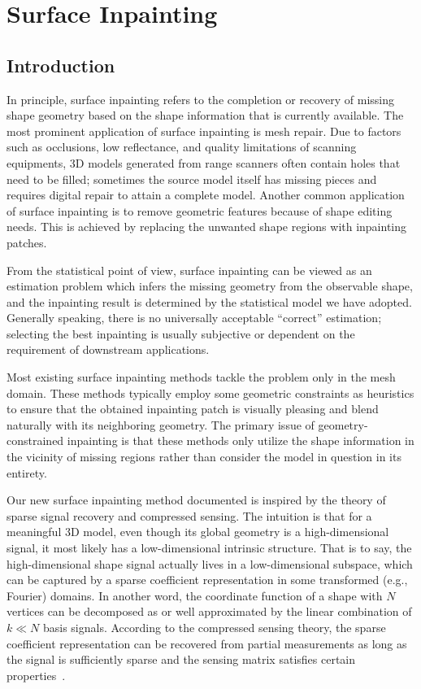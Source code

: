 \chapter{Surface Inpainting}

\section{Introduction}

In principle, surface inpainting refers to the completion or recovery of
missing shape geometry based on the shape information that is currently
available. The most prominent application of surface inpainting is mesh repair.
Due to factors such as occlusions, low reflectance, and quality limitations of
scanning equipments, 3D models generated from range scanners often contain
holes that need to be filled; sometimes the source model itself has missing
pieces and requires digital repair to attain a complete model. Another common
application of surface inpainting is to remove geometric features because of
shape editing needs. This is achieved by replacing the unwanted shape regions
with inpainting patches.

From the statistical point of view, surface inpainting can be viewed as an
estimation problem which infers the missing geometry from the observable shape,
and the inpainting result is determined by the statistical model we have
adopted. Generally speaking, there is no universally acceptable ``correct''
estimation; selecting the best inpainting is usually subjective or dependent on
the requirement of downstream applications.

Most existing surface inpainting methods tackle the problem only in
the mesh domain. These methods typically employ some geometric
constraints as heuristics to ensure that the obtained inpainting patch
is visually pleasing and blend naturally with its neighboring
geometry. The primary issue of geometry-constrained inpainting is that
these methods only utilize the shape information in the vicinity of
missing regions rather than consider the model in question in its
entirety.

Our new surface inpainting method documented is inspired
by the theory of sparse signal recovery and compressed sensing. The
intuition is that for a meaningful 3D model, even though its global
geometry is a high-dimensional signal, it most likely has a
low-dimensional intrinsic structure. That is to say, the
high-dimensional shape signal actually lives in a low-dimensional
subspace, which can be captured by a sparse coefficient representation
in some transformed (e.g., Fourier) domains. In another word, the
coordinate function of a shape with $N$ vertices can be decomposed as or
well approximated by the linear combination of $k\ll N$ basis signals.
According to the compressed sensing theory, the sparse coefficient
representation can be recovered from partial measurements as long as
the signal is sufficiently sparse and the sensing matrix satisfies
certain properties~\cite{Candes2006}.

